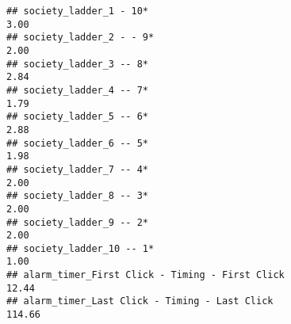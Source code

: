 \documentclass[
]{article}
\begin{document}
\begin{verbatim}
## society_ladder_1 - 10*                                                                                                                                                                                                        3.00
## society_ladder_2 - - 9*                                                                                                                                                                                                       2.00
## society_ladder_3 -- 8*                                                                                                                                                                                                        2.84
## society_ladder_4 -- 7*                                                                                                                                                                                                        1.79
## society_ladder_5 -- 6*                                                                                                                                                                                                        2.88
## society_ladder_6 -- 5*                                                                                                                                                                                                        1.98
## society_ladder_7 -- 4*                                                                                                                                                                                                        2.00
## society_ladder_8 -- 3*                                                                                                                                                                                                        2.00
## society_ladder_9 -- 2*                                                                                                                                                                                                        2.00
## society_ladder_10 -- 1*                                                                                                                                                                                                       1.00
## alarm_timer_First Click - Timing - First Click                                                                                                                                                                               12.44
## alarm_timer_Last Click - Timing - Last Click                                                                                                                                                                                114.66

\end{verbatim}
\end{document}
